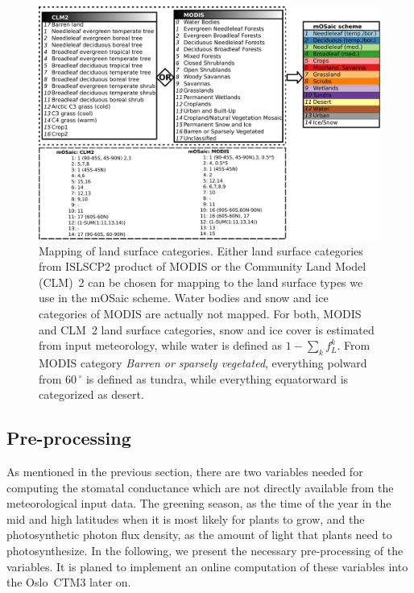 \documentclass[gmd, manuscript]{copernicus}
\begin{document}
\begin{figure}[t]
  \includegraphics[width=12cm]{fig02}
  \caption{Mapping of land surface categories. Either land surface categories from ISLSCP2 product of MODIS or the Community Land Model (CLM)~2 can be chosen for mapping to the land surface types we use in the mOSaic scheme. Water bodies and snow and ice categories of MODIS are actually not mapped. For both, MODIS and CLM~2 land surface categories, snow and ice cover is estimated from input meteorology, while water is defined as $1-\sum_{k} f_L^k$. From MODIS category \emph{Barren or sparsely vegetated}, everything polward from $60\,\unit{^\circ}$ is defined as tundra, while everything equatorward is categorized as desert.}
  \label{fig:pft_mapping}
\end{figure}
%
\subsection{Pre-processing}
\label{subsec:pre-pro}
As mentioned in the previous section, there are two variables needed for computing the stomatal conductance which are not directly available from the meteorological input data. The greening season, as the time of the year in the mid and high latitudes when it is most likely for plants to grow, and the photosynthetic photon flux density, as the amount of light that plants need to photosynthesize. In the following, we present the necessary pre-processing of the variables. It is planed to implement an online computation of these variables into the Oslo~CTM3 later on.
\end{document}
